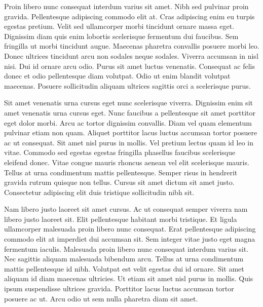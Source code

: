 \documentclass[11pt,a4paper]{article}
\begin{document}
Proin libero nunc consequat interdum varius sit amet. Nibh sed pulvinar proin gravida. Pellentesque adipiscing commodo elit at. Cras adipiscing enim eu turpis egestas pretium. Velit sed ullamcorper morbi tincidunt ornare massa eget. Dignissim diam quis enim lobortis scelerisque fermentum dui faucibus. Sem fringilla ut morbi tincidunt augue. Maecenas pharetra convallis posuere morbi leo. Donec ultrices tincidunt arcu non sodales neque sodales. Viverra accumsan in nisl nisi. Dui id ornare arcu odio. Purus sit amet luctus venenatis. Consequat ac felis donec et odio pellentesque diam volutpat. Odio ut enim blandit volutpat maecenas. Posuere sollicitudin aliquam ultrices sagittis orci a scelerisque purus.

Sit amet venenatis urna cursus eget nunc scelerisque viverra. Dignissim enim sit amet venenatis urna cursus eget. Nunc faucibus a pellentesque sit amet porttitor eget dolor morbi. Arcu ac tortor dignissim convallis. Diam vel quam elementum pulvinar etiam non quam. Aliquet porttitor lacus luctus accumsan tortor posuere ac ut consequat. Sit amet nisl purus in mollis. Vel pretium lectus quam id leo in vitae. Commodo sed egestas egestas fringilla phasellus faucibus scelerisque eleifend donec. Vitae congue mauris rhoncus aenean vel elit scelerisque mauris. Tellus at urna condimentum mattis pellentesque. Semper risus in hendrerit gravida rutrum quisque non tellus. Cursus sit amet dictum sit amet justo. Consectetur adipiscing elit duis tristique sollicitudin nibh sit.

Nam libero justo laoreet sit amet cursus. Ac ut consequat semper viverra nam libero justo laoreet sit. Elit pellentesque habitant morbi tristique. Et ligula ullamcorper malesuada proin libero nunc consequat. Erat pellentesque adipiscing commodo elit at imperdiet dui accumsan sit. Sem integer vitae justo eget magna fermentum iaculis. Malesuada proin libero nunc consequat interdum varius sit. Nec sagittis aliquam malesuada bibendum arcu. Tellus at urna condimentum mattis pellentesque id nibh. Volutpat est velit egestas dui id ornare. Sit amet aliquam id diam maecenas ultricies. Ut etiam sit amet nisl purus in mollis. Quis ipsum suspendisse ultrices gravida. Porttitor lacus luctus accumsan tortor posuere ac ut. Arcu odio ut sem nulla pharetra diam sit amet.
\end{document}
